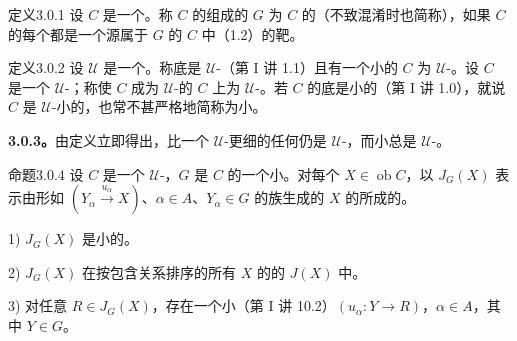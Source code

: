 \begin{SGAresult}{定义}{3.0.1}
设 $C$ 是一个。称 $C$ 的组成的 $G$ 为 $C$ 的（不致混淆时也简称），如果 $C$ 的每个都是一个源属于 $G$ 的 $C$ 中（1.2）的靶。
\end{SGAresult}
\begin{SGAresult}{定义}{3.0.2}
设 $\mathcal U$ 是一个。称底是 $\mathcal U$-（第 I 讲 1.1）且有一个小的 $C$ 为 $\mathcal U$-。设 $C$ 是一个 $\mathcal U$-；称使 $C$ 成为 $\mathcal U$-的 $C$ 上为 $\mathcal U$-。若 $C$ 的底是小的（第 I 讲 1.0），就说 $C$ 是 $\mathcal U$-小的，也常不甚严格地简称为小。
\end{SGAresult}
\textbf{3.0.3。}由定义立即得出，比一个 $\mathcal U$-更细的任何仍是 $\mathcal U$-，而小总是 $\mathcal U$-。
\begin{SGAresult}{命题}{3.0.4}
设 $C$ 是一个 $\mathcal U$-，$G$ 是 $C$ 的一个小。对每个 $X\in\operatorname{ob}C$，以 $J_G(X)$ 表示由形如 $(Y_\alpha\xrightarrow{u_\alpha}X)$、$\alpha\in A$、$Y_\alpha\in G$ 的族生成的 $X$ 的所成的。
\par 1)  $J_G(X)$ 是小的。
\par 2)  $J_G(X)$ 在按包含关系排序的所有 $X$ 的的 $J(X)$ 中。
\par 3) 对任意 $R\in J_G(X)$，存在一个小（第 I 讲 10.2）$(u_\alpha:Y\to R)$，$\alpha\in A$，其中 $Y\in G$。
\end{SGAresult}
